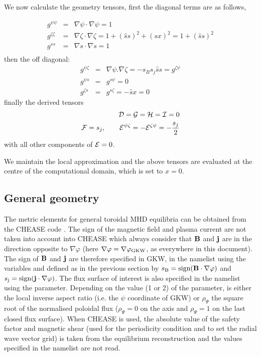 We now calculate the geometry tensors, first the diagonal terms are as follows,

\begin{eqnarray}
g^{\psi\psi} &=& \nabla\psi \cdot \nabla\psi = 1 \\
g^{\zeta\zeta} &=& \nabla\zeta \cdot \nabla\zeta = 1 + (\hat{s}s)^{2} + (sx)^2 = 1 + (\hat{s}s)^{2} \\
g^{ss}   &=& \nabla s \cdot \nabla s = 1 \\
\end{eqnarray}
then the off diagonal:
\begin{eqnarray}
g^{\psi\zeta} &=& \nabla\psi . \nabla\zeta = -s_B s_j \hat{s} s = g^{\zeta\psi} \\
g^{\psi s} &=& g^{s \psi} = 0 \\
g^{\zeta s} &=& g^{s\zeta} = -\hat{s}x = 0
\end{eqnarray}
finally the derived tensors
\begin{eqnarray}
{\cal D}={\cal G}={\cal H}={\cal I} = 0 \\
{\cal F}= s_j, \qquad {\cal E}^{\psi \zeta} = -{\cal E}^{\zeta \psi} = -{s_j \over 2}\\
\end{eqnarray}
with all other components of ${\cal E}=0$.

We maintain the local approximation and the above tensors are evaluated at the centre of the
computational domain, which is set to $x=0$.



\subsection{General geometry}
The metric elements for general toroidal MHD equilibria can be obtained from the CHEASE code \cite{LUT96}. The sign of the magnetic field and plasma current are not taken into account into CHEASE
which always consider that ${\bf B}$ and ${\bf j}$ are in the direction opposite to $\nabla \varphi$ (here
$\nabla \varphi = \nabla \varphi_{\rm GKW}$, as everywhere in this document). The sign of ${\bf B}$ and ${\bf j}$ are therefore specified in GKW, in the  namelist
using the variables  and  defined as in the previous section by $s_{\rm B}=\textrm{sign}(\bf{B}\cdot\nabla\varphi)$ and $s_{\rm j}=\textrm{sign}(\bf{j}\cdot\nabla\varphi)$. The flux
surface of interest is also specified in the  namelist using the  parameter. Depending on the value (1 or 2) of the  parameter,  is either the local
inverse aspect ratio (i.e. the $\psi$ coordinate of GKW) or $\rho_\Psi$ the square root of the normalised poloidal flux ($\rho_\Psi=0$ on the axis and $\rho_\Psi=1$ on the last closed flux surface).
When CHEASE is used, the absolute value of the safety factor and magnetic shear (used for the periodicity condition and to set the radial wave vector grid) is taken from the equilibrium
reconstruction and the values specified in the namelist  are not read. 

